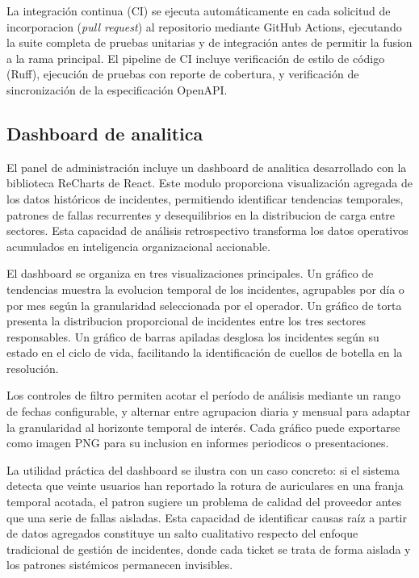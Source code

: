 La integración continua (CI) se ejecuta automáticamente en cada solicitud de incorporacion (\emph{pull request}) al repositorio mediante GitHub Actions, ejecutando la suite completa de pruebas unitarias y de integración antes de permitir la fusion a la rama principal. El pipeline de CI incluye verificación de estilo de código (Ruff), ejecución de pruebas con reporte de cobertura, y verificación de sincronización de la especificación OpenAPI.

\subsection{Dashboard de analitica}

El panel de administración incluye un dashboard de analitica desarrollado con la biblioteca ReCharts de React. Este modulo proporciona visualización agregada de los datos históricos de incidentes, permitiendo identificar tendencias temporales, patrones de fallas recurrentes y desequilibrios en la distribucion de carga entre sectores. Esta capacidad de análisis retrospectivo transforma los datos operativos acumulados en inteligencia organizacional accionable.

El dashboard se organiza en tres visualizaciones principales. Un gráfico de tendencias muestra la evolucion temporal de los incidentes, agrupables por día o por mes según la granularidad seleccionada por el operador. Un gráfico de torta presenta la distribucion proporcional de incidentes entre los tres sectores responsables. Un gráfico de barras apiladas desglosa los incidentes según su estado en el ciclo de vida, facilitando la identificación de cuellos de botella en la resolución.

Los controles de filtro permiten acotar el período de análisis mediante un rango de fechas configurable, y alternar entre agrupacion diaria y mensual para adaptar la granularidad al horizonte temporal de interés. Cada gráfico puede exportarse como imagen PNG para su inclusion en informes periodicos o presentaciones.

La utilidad práctica del dashboard se ilustra con un caso concreto: si el sistema detecta que veinte usuarios han reportado la rotura de auriculares en una franja temporal acotada, el patron sugiere un problema de calidad del proveedor antes que una serie de fallas aisladas. Esta capacidad de identificar causas raíz a partir de datos agregados constituye un salto cualitativo respecto del enfoque tradicional de gestión de incidentes, donde cada ticket se trata de forma aislada y los patrones sistémicos permanecen invisibles.

\newpage
